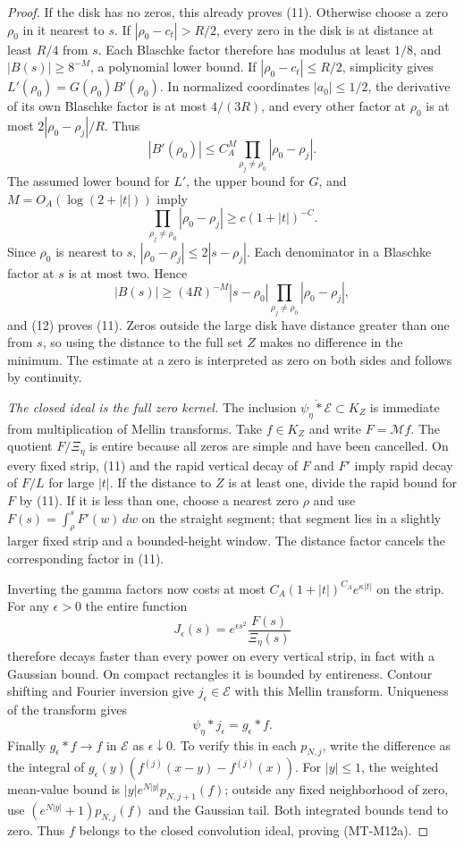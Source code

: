 \documentclass[11pt,a4paper]{article}
\begin{document}
\begin{proof}
If the disk has no zeros, this already proves (11).
Otherwise choose a zero $\rho_0$ in it nearest to $s$.
If $|\rho_0-c_t|>R/2$, every zero in the disk is at
distance at least $R/4$ from $s$. Each Blaschke factor
therefore has modulus at least $1/8$, and
$|B(s)|\ge8^{-M}$, a polynomial lower bound.
If $|\rho_0-c_t|\le R/2$, simplicity gives
$L'(\rho_0)=G(\rho_0)B'(\rho_0)$.
In normalized coordinates $|a_0|\le1/2$, the derivative
of its own Blaschke factor is at most $4/(3R)$, and
every other factor at $\rho_0$ is at most
$2|\rho_0-\rho_j|/R$. Thus
\[
 |B'(\rho_0)|\le C_A^M
                     \prod_{\rho_j\ne\rho_0}|\rho_0-\rho_j|.
\]
The assumed lower bound for $L'$, the upper bound for $G$,
and $M=O_A(\log(2+|t|))$ imply
\[
          \prod_{\rho_j\ne\rho_0}|\rho_0-\rho_j|
                          \ge c(1+|t|)^{-C}.           \tag{12}
\]
Since $\rho_0$ is nearest to $s$,
$|\rho_0-\rho_j|\le2|s-\rho_j|$. Each denominator in a
Blaschke factor at $s$ is at most two. Hence
\[
 |B(s)|\ge(4R)^{-M}|s-\rho_0|
                       \prod_{\rho_j\ne\rho_0}|\rho_0-\rho_j|,
\]
and (12) proves (11). Zeros outside the large disk have
distance greater than one from $s$, so using the distance
to the full set $Z$ makes no difference in the minimum.
The estimate at a zero is interpreted as zero on both
sides and follows by continuity.

\emph{The closed ideal is the full zero kernel.}
The inclusion
$\overline{\psi_\eta*\mathcal E}\subset K_Z$ is immediate
from multiplication of Mellin transforms.
Take $f\in K_Z$ and write $F=\mathcal Mf$.
The quotient $F/\Xi_\eta$ is entire because all zeros
are simple and have been cancelled. On every fixed strip,
(11) and the rapid vertical decay of $F$ and $F'$ imply
rapid decay of $F/L$ for large $|t|$. If the distance to
$Z$ is at least one, divide the rapid bound for $F$
by (11). If it is less than one, choose a nearest zero
$\rho$ and use
$F(s)=\int_\rho^s F'(w)\,dw$ on the straight segment;
that segment lies in a slightly larger fixed strip and
a bounded-height window. The distance factor cancels
the corresponding factor in (11).

Inverting the gamma factors now costs at most
$C_A(1+|t|)^{C_A}e^{\kappa|t|}$ on the strip.
For any $\epsilon>0$ the entire function
\[
             J_\epsilon(s)=e^{\epsilon s^2}
                                  \frac{F(s)}{\Xi_\eta(s)}
\]
therefore decays faster than every power on every vertical
strip, in fact with a Gaussian bound. On compact rectangles
it is bounded by entireness. Contour shifting and Fourier
inversion give $j_\epsilon\in\mathcal E$ with this Mellin
transform. Uniqueness of the transform gives
\[
                  \psi_\eta*j_\epsilon=g_\epsilon*f.
\]
Finally $g_\epsilon*f\to f$ in $\mathcal E$ as
$\epsilon\downarrow0$. To verify this in each $p_{N,j}$,
write the difference as the integral of
$g_\epsilon(y)(f^{(j)}(x-y)-f^{(j)}(x))$.
For $|y|\le1$, the weighted mean-value bound is
$|y|e^{N|y|}p_{N,j+1}(f)$; outside any fixed
neighborhood of zero, use
$(e^{N|y|}+1)p_{N,j}(f)$ and the Gaussian tail.
Both integrated bounds tend to zero.
Thus $f$ belongs to the closed convolution ideal,
proving (MT-M12a).


\end{proof}
\end{document}
